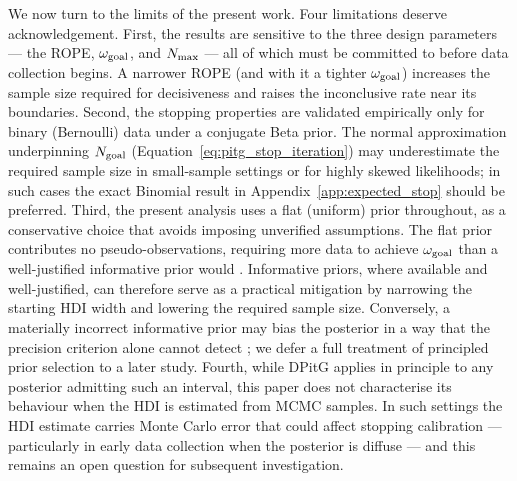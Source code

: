 We now turn to the limits of the present work.
Four limitations deserve acknowledgement.
First, the results are sensitive to the three design parameters --- the ROPE,
$\omega_{\rm goal}$, and $N_{\rm max}$ --- all of which must be committed to before
data collection begins.
A narrower ROPE (and with it a tighter $\omega_{\rm goal}$) increases the sample size
required for decisiveness and raises the
inconclusive rate near its boundaries.
Second, the stopping properties are validated empirically only for binary (Bernoulli)
data under a conjugate Beta prior.
The normal approximation underpinning $N_{\rm goal}$
(Equation~\ref{eq:pitg_stop_iteration}) may underestimate the required sample size
in small-sample settings or for highly skewed likelihoods; in such cases the exact
Binomial result in Appendix~\ref{app:expected_stop} should be preferred.
Third, the present analysis uses a flat (uniform) prior throughout, as a conservative
choice that avoids imposing unverified assumptions.
The flat prior contributes no pseudo-observations, requiring more data to achieve
$\omega_{\rm goal}$ than a well-justified informative prior would \citep[][Ch.~2]{gelman2013bayesian}.
Informative priors, where available and well-justified, can therefore serve as a
practical mitigation by narrowing the starting HDI width and lowering the required
sample size.
Conversely, a materially incorrect informative prior may bias the posterior in a way
that the precision criterion alone cannot detect \citep[][Ch.~6]{gelman2013bayesian};
we defer a full treatment of principled prior selection to a later study.
Fourth, while DPitG applies in principle to any posterior admitting such an interval,
this paper does not characterise its behaviour when the HDI is estimated from MCMC
samples.
In such settings the HDI estimate carries Monte Carlo error \citep{kruschke2015doing}
that could affect stopping
calibration --- particularly in early data collection when the posterior is diffuse ---
and this remains an open question for subsequent investigation.



